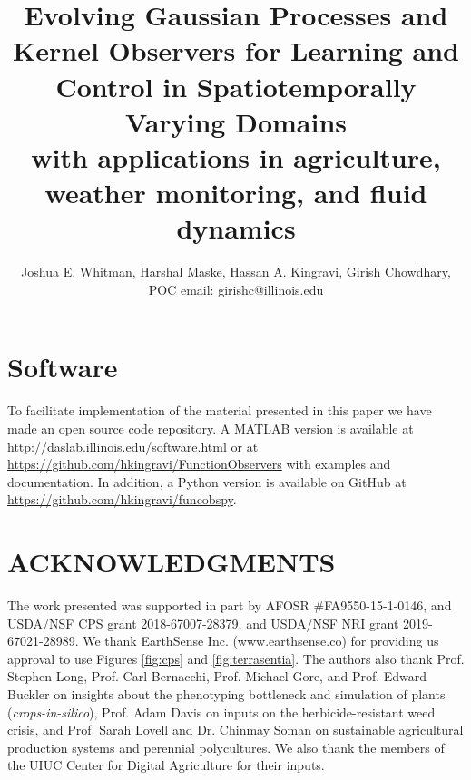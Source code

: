 \documentclass[letterpaper,12pt,peerreviewca,draftcls]{IEEEtran}
\title{Evolving Gaussian Processes and Kernel Observers for Learning and Control in Spatiotemporally Varying Domains\\\Large with applications in agriculture, weather monitoring, and fluid dynamics}
\author{Joshua E. Whitman, Harshal Maske, Hassan A. Kingravi, Girish Chowdhary, \\ POC email: girishc@illinois.edu}
\newcommand{\mX}[1]{\added[id=ml,remark={}]{#1}}
\newcommand{\bX}[1]{\added[id=bc,remark={}]{#1}}
\begin{document}
\maketitle
\CSMsetup
\linenumbers \modulolinenumbers[5] %







%

\section{Software}
To facilitate implementation of the material presented in this paper we have made an open source code repository. A MATLAB version is available at \url{http://daslab.illinois.edu/software.html} or at \url{https://github.com/hkingravi/FunctionObservers} with examples and documentation. In addition, a Python version is available on GitHub at \url{https://github.com/hkingravi/funcobspy}.

\section{ACKNOWLEDGMENTS}
The work presented was supported in part by AFOSR \#FA9550-15-1-0146, %
and USDA/NSF CPS grant 2018-67007-28379, and USDA/NSF NRI grant 2019-67021-28989.  We thank EarthSense Inc. (www.earthsense.co) for providing us approval to use Figures \ref{fig:cps} and \ref{fig:terrasentia}. The authors also thank Prof. Stephen Long, Prof. Carl Bernacchi, Prof. Michael Gore, and Prof. Edward Buckler on insights about the phenotyping bottleneck and simulation of plants (\textit{crops-in-silico}), Prof. Adam Davis on inputs on the herbicide-resistant weed crisis, and Prof. Sarah Lovell and Dr. Chinmay Soman on sustainable agricultural production systems and perennial polycultures. We also thank the members of the UIUC Center for Digital Agriculture for their inputs.

%

\end{document}
